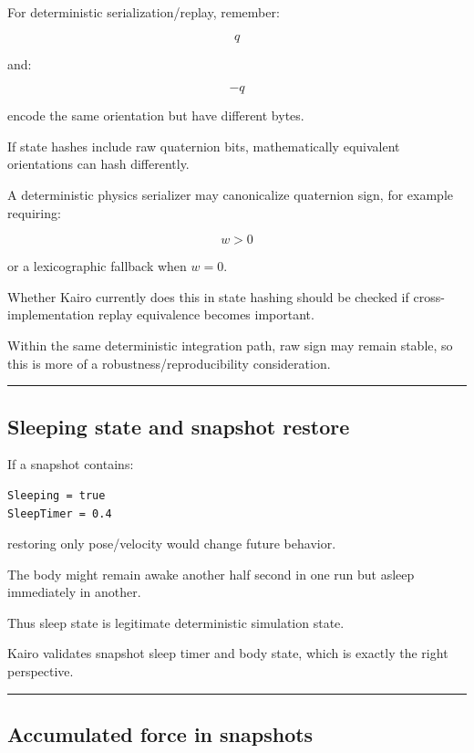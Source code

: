 For deterministic serialization/replay, remember:

\[
q
\]

and:

\[
-q
\]

encode the same orientation but have different bytes.

If state hashes include raw quaternion bits, mathematically equivalent orientations can hash differently.

A deterministic physics serializer may canonicalize quaternion sign, for example requiring:

\[
w>0
\]

or a lexicographic fallback when \(w=0\).

Whether Kairo currently does this in state hashing should be checked if cross-implementation replay equivalence becomes important.

Within the same deterministic integration path, raw sign may remain stable, so this is more of a robustness/reproducibility consideration.

\begin{center}\rule{0.5\linewidth}{0.5pt}\end{center}

\subsection{Sleeping state and snapshot restore}\label{06-engine-ii-ch038-sleeping-state-and-snapshot-restore}

\hypertarget{06-engine-ii-ch038-sleeping-state-and-snapshot-restore}{}

If a snapshot contains:

\begin{verbatim}
Sleeping = true
SleepTimer = 0.4
\end{verbatim}

restoring only pose/velocity would change future behavior.

The body might remain awake another half second in one run but asleep immediately in another.

Thus sleep state is legitimate deterministic simulation state.

Kairo validates snapshot sleep timer and body state, which is exactly the right perspective.

\begin{center}\rule{0.5\linewidth}{0.5pt}\end{center}

\subsection{Accumulated force in snapshots}\label{06-engine-ii-ch038-accumulated-force-in-snapshots}

